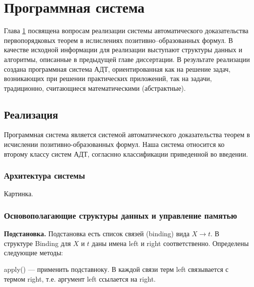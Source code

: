 \chapter{Программная система}\label{part:three}

Глава \ref{part:three} посвящена вопросам реализации системы автоматического доказательства первопорядковых теорем в ислислениях позитивно--образованных формул. В качестве исходной информации для реализации выступают структуры данных и алгоритмы, описанные в предыдущей главе диссертации. В результате реализации создана программная система АДТ, ориентированная как на решение задач, возникающих при решении практических приложений, так на задачи, традиционно, считающиеся математическими (абстрактные).

\section{Реализация}

Программная система является системой автоматического доказательства теорем в исчислении позитивно-образованных формул. Наша система относится ко второму классу систем АДТ, согласнно классификации приведенной во введении.

\subsection{Архитектура системы}
Картинка.


\subsection{Основополагающие структуры данных и управление памятью}

\textbf{Подстановка.} Подстановка есть список связей (binding) вида $X \rightarrow t$. В структуре Binding для $X$ и $t$ даны имена left и right соответственно. Определены следующие методы:

apply() --- применить подставноку. В каждой связи терм left связывается с термом right, т.е. аргумент left ссылается на right.

